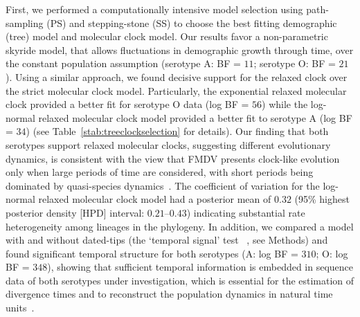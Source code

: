 \documentclass[10pt]{article}
\begin{document}
First, we performed a computationally intensive model selection using path-sampling (PS) and stepping-stone (SS) to choose the best fitting demographic (tree) model and molecular clock model.
Our results favor a non-parametric skyride model, that allows fluctuations in demographic growth through time, over the constant population assumption (serotype A: BF = $11$; serotype O: BF = $21$).
Using a similar approach, we  found decisive support for the relaxed clock over the strict molecular clock model.
Particularly, the exponential relaxed molecular clock provided a better fit for serotype O data (log BF = $56$) while the log-normal relaxed molecular clock model provided a better fit to serotype A (log BF = $34$) (see Table~\ref{stab:treeclockselection} for details). 
Our finding that both serotypes support relaxed molecular clocks, suggesting different evolutionary dynamics, is consistent with the view that FMDV presents clock-like evolution only when large periods of time are considered, with short periods being dominated by quasi-species dynamics~\cite{Muellner2011}.  
The coefficient of variation for the log-normal relaxed molecular clock model had a posterior mean of $0.32$ (95\% highest posterior density [HPD] interval: $0.21$--$0.43$) indicating substantial rate heterogeneity among lineages in the phylogeny.
In addition, we compared a model with and without dated-tips (the `temporal signal' test~\cite{Faria2012} , see Methods) and found significant temporal structure for both serotypes (A: log BF = $310$; O: log BF = $348$), showing that sufficient temporal information is embedded in sequence data of both serotypes under investigation, which is essential for the estimation of divergence times and to reconstruct the population dynamics in natural time units~\cite{MEP}. 
\end{document}
